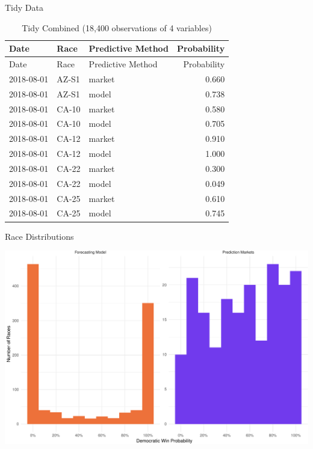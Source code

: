 \documentclass[ignorenonframetext,]{beamer}
\begin{document}
\begin{frame}{Tidy Data}
\protect\hypertarget{tidy-data}{}

\begin{longtable}[]{@{}lllr@{}}
\caption{Tidy Combined (18,400 observations of 4
variables)}\tabularnewline
\toprule
Date & Race & Predictive Method & Probability\tabularnewline
\midrule
\endfirsthead
\toprule
Date & Race & Predictive Method & Probability\tabularnewline
\midrule
\endhead
2018-08-01 & AZ-S1 & market & 0.660\tabularnewline
2018-08-01 & AZ-S1 & model & 0.738\tabularnewline
2018-08-01 & CA-10 & market & 0.580\tabularnewline
2018-08-01 & CA-10 & model & 0.705\tabularnewline
2018-08-01 & CA-12 & market & 0.910\tabularnewline
2018-08-01 & CA-12 & model & 1.000\tabularnewline
2018-08-01 & CA-22 & market & 0.300\tabularnewline
2018-08-01 & CA-22 & model & 0.049\tabularnewline
2018-08-01 & CA-25 & market & 0.610\tabularnewline
2018-08-01 & CA-25 & model & 0.745\tabularnewline
\bottomrule
\end{longtable}

\end{frame}

\begin{frame}{Race Distributions}
\protect\hypertarget{race-distributions}{}

\includegraphics{presentation_files/figure-beamer/plot_races_hist-1.pdf}

\end{frame}
\end{document}

